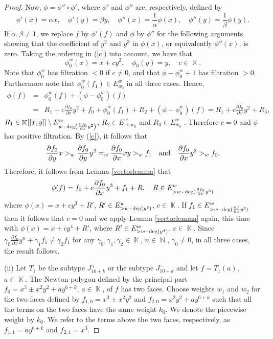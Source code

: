 \documentclass[noend]{amsproc}
\theoremstyle{definition}
\DeclareMathOperator{\N}{\mathbb{N}}
\DeclareMathOperator{\K}{\mathbb{K}}
\DeclareMathOperator{\dash}{\textnormal{-}}
\begin{document}
\begin{proof}
Now, $\phi=\phi''\circ\phi'$, where $\phi'$ and $\phi''$ are, respectively, defined by
\[\phi'(x)=\alpha x,\quad \phi'(y)=\beta y, \quad \phi''(x)=\frac{1}{\alpha}\phi(x), \quad\phi''(y)=\frac{1}{\beta}\phi(y).\]
If $\alpha,\beta\neq 1$, we replace $f$ by $\phi'(f)$ and $\phi$ by $\phi''$ for the following arguments showing that the coefficient of $y^2$ and $y^3$ in $\phi(x)$, or equivalently $\phi''(x)$, is zero. Taking the ordering in (\ref{c}) into account, we have that \[\phi_0^w(x)=x+cy^2, \quad\phi_0(y)=y,\quad c\in\K.\] Note that $\phi^w_0$ has filtration $<0$ if $c\neq 0$, and that $\phi-\phi^w_0+1$ has filtration $>0$. Furthermore note that $\phi_0^w(f_1)\in E_{w_0}^w$ in all three cases. Hence,
\begin{eqnarray*}
\phi(f)&=&\phi_0^w(f)+(\phi-\phi^w_0)(f)\\
&=& R_1+c\frac{\partial f_0}{\partial x}y^2+f_0+\phi^w_0(f_1)+R_2 +(\phi-\phi^w_0)(f)=R_1+c\frac{\partial f_0}{\partial x}y^2+R_3,
\end{eqnarray*} 
$R_1\in\K[[x,y]]\setminus E^w_{w\dash\deg\left(\frac{\partial f_0}{\partial x}y^2\right)}$, $R_2\in E^w_{>w_0}$ and $R_3\in E^w_{w_0}$ . Therefore $c=0$ and $\phi$ has positive filtration.
By (\ref{c}), it follows that
\begin{equation*}
\frac{\partial f_0}{\partial y}x >_w\frac{\partial f_0}{\partial y}y^2 =_w \frac{\partial f_0}{\partial x}xy>_w  f_1\quad\textnormal{and}\quad \frac{\partial f_0}{\partial x}y^3>_w f_0.
\end{equation*}
Therefore, it follows from Lemma \ref{vectorlemma} that
\begin{equation*}
\phi(f) = f_0+c\frac{\partial f_0}{\partial x}y^3+f_1+R,\quad R\in E^w_{>w\dash\deg(\frac{\partial f_0}{\partial x}y^3)}
\end{equation*}
where $\phi(x) = x+ cy^3+R'$, $R'\in E^w_{>w\dash\deg(y^3)}$, $c\in\K$. If $f_1\in E^w_{>w\dash\deg(\frac{\partial f}{\partial x}y^3)}$ then it follows that $c=0$ and we apply Lemma \ref{vectorlemma} again, this time with $\phi(x)=x+cy^4+R'$, where $R'\in E^w_{>w\dash\deg(y^4)}$, $c\in\K$.  Since $\gamma_0\frac{\partial f_0}{\partial x}y^n+\gamma_1f_1\neq \gamma_2f_1$ for any $\gamma_0,\gamma_1,\gamma_2\in\K$, $n\in\N$, $\gamma_0\neq 0$, in all three cases, the result follows.

(ii) Let $T_1$ be the subtype $J_{10+k}^+$ or the subtype $J_{10+k}^-$ and let $f=T_1(a)$, $a\in\K$. 
The Newton polygon defined by the principal part $f_0=x^3\pm x^2y^2+ay^{6+k}$, $a\in\K$, of $f$ has two faces. Choose weights $w_1$ and $w_2$ for the two faces defined by $f_{1,0}=x^3\pm x^2y^2$ and $f_{2,0}=x^2y^2+ay^{6+k}$ such that all the terms on the two faces have the same weight $k_0$. We denote the piecewise weight by $k_0$. We refer to the terms above the two faces, respectively, as $f_{1,1}=ay^{6+k}$ and $f_{2,1}=x^3$.


\end{proof}
\end{document}
